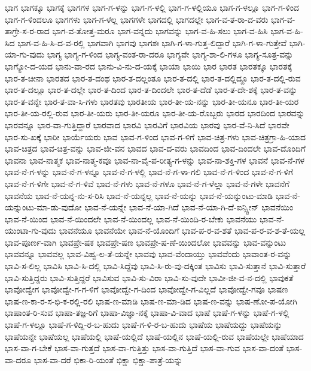 {ಭಾಗ
ಭಾಗಕ್ಕೂ
ಭಾಗಕ್ಕೆ
ಭಾಗಗಳ
ಭಾಗ-ಗ-ಳನ್ನು
ಭಾಗ-ಗ-ಳಲ್ಲಿ
ಭಾಗ-ಗ-ಳಲ್ಲಿಯೂ
ಭಾಗ-ಗ-ಳಲ್ಲೂ
ಭಾಗ-ಗ-ಳಿಂದ
ಭಾಗ-ಗ-ಳಿಂದಲೂ
ಭಾಗಗಳು
ಭಾಗ-ಗ-ಳೆಲ್ಲ
ಭಾಗಗಳೇ
ಭಾಗದಲ್ಲಿ
ಭಾಗದಲ್ಲೇ
ಭಾಗ-ವ-ತ-ರಾ-ದ-ವರು
ಭಾಗ-ವ-ತಾಗ್ರೇ-ಸ-ರ-ರಾದ
ಭಾಗ-ವ-ತೋತ್ತ-ಮರೂ
ಭಾಗ-ವನ್ನದು
ಭಾಗವನ್ನು
ಭಾಗ-ವ-ಹಿ-ಸಲು
ಭಾಗ-ವ-ಹಿಸಿ
ಭಾಗ-ವ-ಹಿ-ಸಿದ
ಭಾಗ-ವ-ಹಿ-ಸಿ-ದ-ವ-ರಲ್ಲಿ
ಭಾಗವಾಗಿ
ಭಾಗವು
ಭಾಗಶಃ
ಭಾಗಿ-ಗ-ಳಾ-ಗುತ್ತ-ಲಿದ್ದಾರೆ
ಭಾಗಿ-ಗ-ಳಾ-ಗುತ್ತೇವೆ
ಭಾಗಿ-ಯಾ-ಗು-ವುದು
ಭಾಗ್ಯ
ಭಾಗ್ಯ-ಗ-ಳಿಂದ
ಭಾಗ್ಯ-ವಂತ-ರಾ-ದರೂ
ಭಾಗ್ಯವೇ
ಭಾಗ್ಯ-ಶಾ-ಲಿ-ಗಳೂ
ಭಾಗ್ಯ-ಸೂತ್ರ-ವನ್ನು
ಭಾಗ್ಯೋ-ದ-ಯದ
ಭಾನು-ವಾ-ರದ
ಭಾನು-ವಿ-ನು-ದ-ಯಕ್ಕೆ
ಭಾಯಾ
ಭಾಯಿ
ಭಾರ
ಭಾರತ
ಭಾರತಕ್ಕೂ
ಭಾರತಕ್ಕೆ
ಭಾರ-ತ-ಚೀನಾ
ಭಾರತದ
ಭಾರ-ತ-ದಂಥ
ಭಾರ-ತ-ದಲ್ಲಂತೂ
ಭಾರ-ತ-ದಲ್ಲಿ
ಭಾರ-ತ-ದಲ್ಲಿದ್ದೂ
ಭಾರ-ತ-ದಲ್ಲಿ-ರುವ
ಭಾರ-ತ-ದಲ್ಲೂ
ಭಾರ-ತ-ದಲ್ಲೇ
ಭಾರ-ತ-ದಿಂದ
ಭಾರ-ತ-ದಿಂದಲೇ
ಭಾರ-ತ-ದೆಡೆ
ಭಾರ-ತ-ದೇ-ಶಕ್ಕೆ
ಭಾರ-ತ-ವನ್ನು
ಭಾರ-ತ-ವನ್ನೇ
ಭಾರ-ತ-ವಾ-ಸಿ-ಗಳು
ಭಾರತವು
ಭಾರತೀಯ
ಭಾರ-ತೀ-ಯ-ನನ್ನು
ಭಾರ-ತೀ-ಯನೂ
ಭಾರ-ತೀ-ಯರ
ಭಾರ-ತೀ-ಯ-ರಲ್ಲಿ-ರುವ
ಭಾರ-ತೀ-ಯರು
ಭಾರ-ತೀ-ಯರೂ
ಭಾರ-ತೀ-ಯ-ರೊಬ್ಬರು
ಭಾರದ
ಭಾರದಿಂದ
ಭಾರವನ್ನು
ಭಾರವನ್ನೂ
ಭಾರ-ವಾ-ಗುತ್ತಿದ್ದಾರೆ
ಭಾರವಾದ
ಭಾರವಿ
ಭಾರವಿಗೆ
ಭಾರವಿಯ
ಭಾರವು
ಭಾರ-ವೆ-ನಿ-ಸಿದೆ
ಭಾರವೇ
ಭಾರ-ಸು-ಖಕ್ಕೆ
ಭಾರೀ
ಭಾರ್ಯೆಯರು
ಭಾವ
ಭಾವ-ಗ-ಳಿಂದ
ಭಾವ-ಗ-ಳಿಗೆ
ಭಾವ-ಚಿತ್ರ-ಗಳು
ಭಾವ-ಚಿತ್ರಗ್ರಾ-ಹಿ-ಯಾದ
ಭಾವ-ಚಿತ್ರದ
ಭಾವ-ಚಿತ್ರ-ವನ್ನು
ಭಾವ-ಜೀ-ವನ
ಭಾವದ
ಭಾವ-ದ-ವರು
ಭಾವದಿಂದ
ಭಾವ-ದಿಂದಲೇ
ಭಾವ-ದೊಂದಿಗೆ
ಭಾವನಾ
ಭಾವ-ನಾತ್ಮಕ
ಭಾವ-ನಾತ್ಮ-ಕವೂ
ಭಾವ-ನಾ-ವೈ-ಪ-ರೀತ್ಯ-ಗ-ಳನ್ನು
ಭಾವ-ನಾ-ಶಕ್ತಿ-ಗಳ
ಭಾವನೆ
ಭಾವ-ನೆ-ಗಳ
ಭಾವ-ನೆ-ಗ-ಳನ್ನು
ಭಾವ-ನೆ-ಗ-ಳನ್ನೂ
ಭಾವ-ನೆ-ಗ-ಳಲ್ಲಿ
ಭಾವ-ನೆ-ಗ-ಳಾ-ಗಲಿ
ಭಾವ-ನೆ-ಗ-ಳಿಂದ
ಭಾವ-ನೆ-ಗ-ಳಿಗೆ
ಭಾವ-ನೆ-ಗ-ಳಿಗೇ
ಭಾವ-ನೆ-ಗ-ಳಿವೆ
ಭಾವ-ನೆ-ಗಳು
ಭಾವ-ನೆ-ಗಳೂ
ಭಾವ-ನೆ-ಗ-ಳೆಲ್ಲಾ
ಭಾವ-ನೆ-ಗಳೇ
ಭಾವನೆಗೆ
ಭಾವನೆಯ
ಭಾವ-ನೆ-ಯನ್ನ-ನು-ಸ-ರಿಸಿ
ಭಾವ-ನೆ-ಯನ್ನಲ್ಲ
ಭಾವ-ನೆ-ಯನ್ನು
ಭಾವ-ನೆ-ಯನ್ನುಂಟು-ಮಾಡಿ
ಭಾವ-ನೆ-ಯನ್ನುಂಟು-ಮಾ-ಡು-ವುದೋ
ಭಾವ-ನೆ-ಯನ್ನೇ
ಭಾವ-ನೆ-ಯಾ-ಗಿದೆ
ಭಾವ-ನೆ-ಯಾ-ಗಿ-ದೆ-ಐನ್ಸ್ಟೀನ್
ಭಾವನೆಯಿಂ
ಭಾವ-ನೆ-ಯಿಂದ
ಭಾವ-ನೆ-ಯಿಂದಲೇ
ಭಾವ-ನೆ-ಯಿಂದಲ್ಲ
ಭಾವ-ನೆ-ಯಿಂದಿ-ರ-ಬೇಕು
ಭಾವನೆಯು
ಭಾವ-ನೆ-ಯುಂಟಾ-ಗು-ವುದು
ಭಾವನೆಯೂ
ಭಾವನೆಯೇ
ಭಾವ-ನೆ-ಯೊಂದಿಗೆ
ಭಾವ-ಪ-ರ-ವ-ಶತೆ
ಭಾವ-ಪ-ರ-ವ-ಶ-ತೆ-ಯಲ್ಲ
ಭಾವ-ಪೂರ್ಣ-ವಾಗಿ
ಭಾವಪ್ರೇ-ಷಕ
ಭಾವಪ್ರೇ-ಷಣ
ಭಾವಪ್ರೇ-ಷ-ಣೆ-ಯಿಂದಲೋ
ಭಾವವನ್ನು
ಭಾವ-ವನ್ನುಂಟು
ಭಾವವನ್ನೂ
ಭಾವವಲ್ಲ
ಭಾವ-ವಿಹ್ವ-ಲ-ತೆ-ಯನ್ನೇ
ಭಾವವು
ಭಾವ-ವೆಂದಾಯ್ತು
ಭಾವವೆಂದು
ಭಾವಾಂತ-ರ-ವನ್ನು
ಭಾವಿ-ಸ-ಲಿಲ್ಲ
ಭಾವಿಸಿ
ಭಾವಿ-ಸಿ-ದಲ್ಲಿ
ಭಾವಿ-ಸಿದ್ದೆವು
ಭಾವಿ-ಸಿ-ರು-ವು-ದಕ್ಕಿಂತ
ಭಾವಿಸು
ಭಾವಿ-ಸುತ್ತಾನೆ
ಭಾವಿ-ಸುತ್ತಾರೆ
ಭಾವಿ-ಸುತ್ತಿದ್ದರು
ಭಾವಿ-ಸುತ್ತಿದ್ದರೆ
ಭಾವಿಸುವ
ಭಾವಿ-ಸು-ವಿರಾ
ಭಾವಿ-ಸು-ವುದೇ
ಭಾವೀ-ಜೀ-ವ-ನ-ದಲ್ಲಿ
ಭಾವುಕತೆ
ಭಾವೋದ್ವೇಗ
ಭಾವೋದ್ವೇ-ಗ-ಗ-ಳಿಗೆ
ಭಾವೋದ್ವೇ-ಗ-ದಿಂದ
ಭಾವೋದ್ವೇ-ಗ-ವಿಲ್ಲದೆ
ಭಾವೋದ್ವೇ-ಗವೂ
ಭಾಷಣ
ಭಾಷ-ಣ-ಕಾ-ರ-ಸ-ಭಿ-ಕ-ರಲ್ಲಿ-ರಲಿ
ಭಾಷ-ಣ-ಮಾಡಿ
ಭಾಷ-ಣ-ಮಾ-ಡಿದ
ಭಾಷ-ಣ-ವನ್ನು
ಭಾಷ-ಣೋ-ಪ-ಯೋಗಿ
ಭಾಷಾಂತ-ರಿ-ಸುವ
ಭಾಷಾ-ತಜ್ಞ-ರಿಗೆ
ಭಾಷಾ-ವಿಜ್ಞಾ-ನಕ್ಕೆ
ಭಾಷಾ-ವಿ-ವಾದ
ಭಾಷೆ
ಭಾಷೆ-ಗ-ಳನ್ನು
ಭಾಷೆ-ಗ-ಳಲ್ಲಿ
ಭಾಷೆ-ಗ-ಳಲ್ಲೂ
ಭಾಷೆ-ಗ-ಳಿದ್ದಿ-ರ-ಬ-ಹುದು
ಭಾಷೆ-ಗ-ಳಿ-ರ-ಬ-ಹುದು
ಭಾಷೆಯ
ಭಾಷೆಯದ್ದು
ಭಾಷೆಯನ್ನು
ಭಾಷೆಯನ್ನೇ
ಭಾಷೆಯಲ್ಲ
ಭಾಷೆಯಲ್ಲಿ
ಭಾಷೆ-ಯಲ್ಲಿದೆ
ಭಾಷೆ-ಯಲ್ಲಿನ
ಭಾಷೆ-ಯಲ್ಲಿ-ರುವ
ಭಾಷೆಯಲ್ಲೇ
ಭಾಷೆಯಾದ
ಭಾಸ-ವಾ-ಗ-ಬೇಕೆ
ಭಾಸ-ವಾ-ಗುತ್ತದೆ
ಭಾಸ-ವಾ-ಗುತ್ತಿತ್ತು
ಭಾಸ-ವಾ-ಗುತ್ತಿದೆ
ಭಾಸ-ವಾ-ಗುವ
ಭಾಸ-ವಾ-ದಂತೆ
ಭಾಸ-ವಾ-ದರೂ
ಭಾಸ-ವಾ-ದರೆ
ಭಿಕಾ-ರಿ-ಯಂತೆ
ಭಿಕ್ಷಾ
ಭಿಕ್ಷಾ-ಪಾತ್ರೆ-ಯನ್ನು
}
